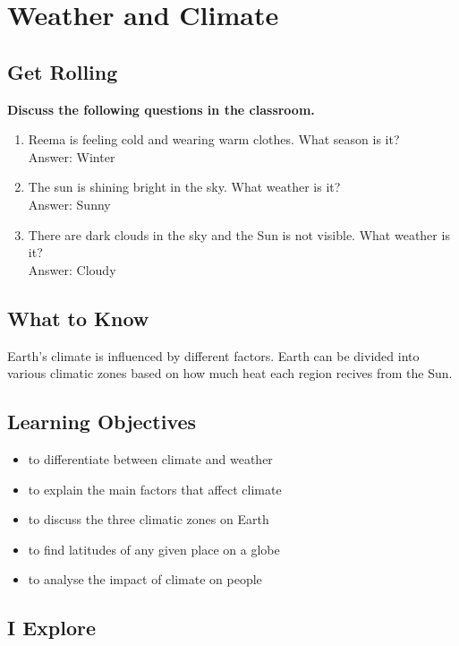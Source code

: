 \chapter{Weather and Climate}
\section{Get Rolling}
\textbf{Discuss the following questions in the classroom.}
\begin{enumerate}
    \item Reema is feeling cold and wearing warm clothes. What season is it?\\
    Answer: Winter
    \item The sun is shining bright in the sky. What weather is it?\\
    Answer: Sunny
    \item There are dark clouds in the sky and the Sun is not visible. What weather is it?\\
    Answer: Cloudy
\end{enumerate}
\section{What to Know}
Earth's climate is influenced by different factors. Earth can be divided into various climatic zones based on how much heat each region recives from the Sun.
\section{\textbf{Learning Objectives}}
\begin{itemize}
    \item to differentiate between climate and weather
    \item to explain the main factors that affect climate
    \item to discuss the three climatic zones on Earth
    \item to find latitudes of any given place on a globe
    \item to analyse the impact of climate on people
\end{itemize}
\section{I Explore}
